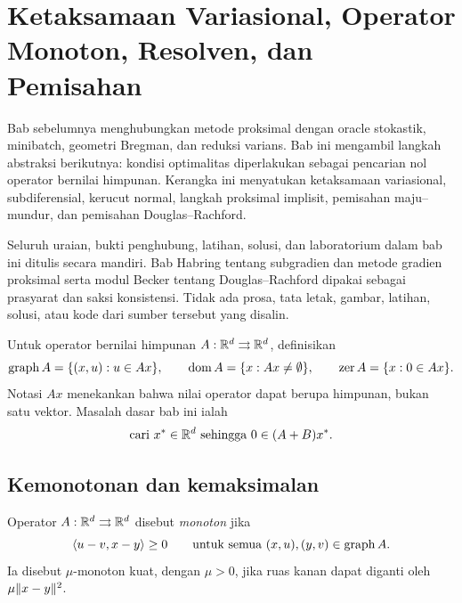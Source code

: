 \chapter{Ketaksamaan Variasional, Operator Monoton, Resolven, dan Pemisahan}
\label{orig02:chapter:monotone-inclusions}

Bab sebelumnya menghubungkan metode proksimal dengan oracle stokastik,
minibatch, geometri Bregman, dan reduksi varians. Bab ini mengambil langkah
abstraksi berikutnya: kondisi optimalitas diperlakukan sebagai pencarian nol
operator bernilai himpunan. Kerangka ini menyatukan ketaksamaan variasional,
subdiferensial, kerucut normal, langkah proksimal implisit, pemisahan
maju--mundur, dan pemisahan Douglas--Rachford.

Seluruh uraian, bukti penghubung, latihan, solusi, dan laboratorium dalam bab
ini ditulis secara mandiri. Bab Habring tentang subgradien dan metode gradien
proksimal serta modul Becker tentang Douglas--Rachford dipakai sebagai
prasyarat dan saksi konsistensi. Tidak ada prosa, tata letak, gambar, latihan,
solusi, atau kode dari sumber tersebut yang disalin.

Untuk operator bernilai himpunan $A:\mathbb{R}^d\rightrightarrows\mathbb{R}^d$, definisikan
\begin{equation}
  \operatorname{\mathrm{graph}} A=\{(x,u):u\in Ax\},
  \qquad
  \operatorname{\mathrm{dom}} A=\{x:Ax\neq\emptyset\},
  \qquad
  \operatorname{zer}A=\{x:0\in Ax\}.
\end{equation}
Notasi $Ax$ menekankan bahwa nilai operator dapat berupa himpunan, bukan satu
vektor. Masalah dasar bab ini ialah
\begin{equation}
  \label{orig02:eq:zero-problem}
  \text{cari }x^*\in\mathbb{R}^d\text{ sehingga }0\in(A+B)x^*.
\end{equation}

\section{Kemonotonan dan kemaksimalan}
\label{orig02:section:monotonicity}

\begin{defn}
  \label{orig02:def:monotone}
  Operator $A:\mathbb{R}^d\rightrightarrows\mathbb{R}^d$ disebut \emph{monoton} jika
  \begin{equation}
    \label{orig02:eq:monotone}
    \left\langle u-v , x-y\right\rangle\geq0
    \qquad
    \text{untuk semua }(x,u),(y,v)\in\operatorname{\mathrm{graph}} A.
  \end{equation}
  Ia disebut $\mu$-monoton kuat, dengan $\mu>0$, jika ruas kanan dapat
  diganti oleh $\mu\|x-y\|^2$.
\end{defn}

